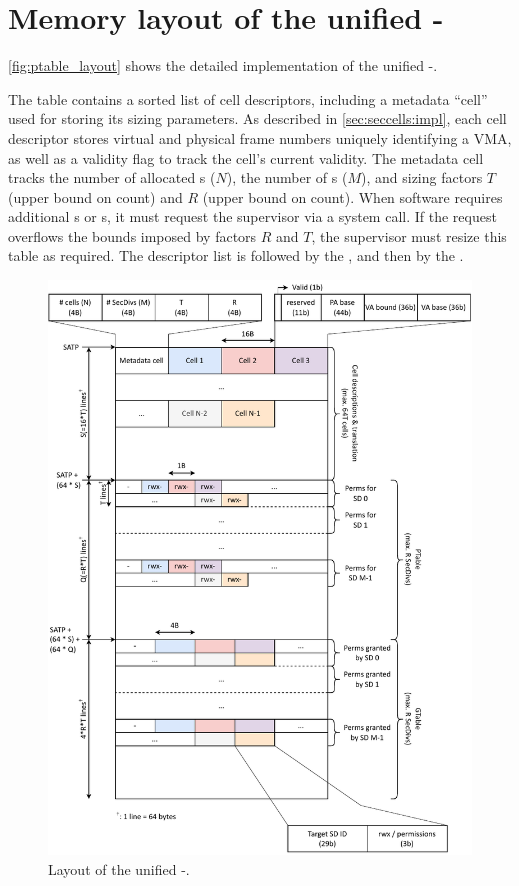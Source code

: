 
\section{Memory layout of the unified \ptable-\gtable}
\label{app:ptable}

\autoref{fig:ptable_layout} shows the detailed implementation of the
unified \ptable-\gtable.

The table contains a sorted list of cell descriptors, including a
metadata ``cell'' used for storing its sizing parameters.
As described in \autoref{sec:seccells:impl}, each cell descriptor stores virtual 
and physical frame numbers uniquely identifying a VMA, as well as a 
validity flag to track the cell's current validity.
The metadata cell tracks the number of allocated \cell{}s ($N$), the
number of \secdiv{}s ($M$), and sizing factors $T$ (upper bound on \cell count)
and $R$ (upper bound on \secdiv count).
When software requires additional \secdiv{}s or \cell{}s, it must request
the supervisor via a system call.
If the request overflows the bounds imposed by factors $R$ and $T$, the
supervisor must resize this table as required.
The \cell descriptor list is followed by the \ptable, and then by the
\gtable.


\begin{figure}
  \centering
  \includegraphics[height=0.95\textheight]{media/seccells/ptable_layout.pdf}
  \caption{Layout of the unified \ptable-\gtable.}
  \label{fig:ptable_layout}
\end{figure}

